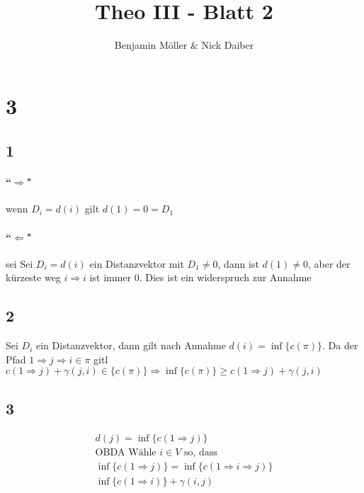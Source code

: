 \documentclass{article}
\title{Theo III - Blatt 2}
\author{Benjamin Möller \& Nick Daiber}
\begin{document}
\maketitle
\section*{3}
\subsection*{1}
\paragraph{``$\Rightarrow$"\\}
wenn $D_i = d(i)$ gilt $d(1)=0=D_1$
\paragraph{``$\Leftarrow$"\\}
sei Sei $D_i = d(i)$ ein Distanzvektor mit $D_1\neq 0$,
dann ist $d(1) \neq 0$, aber der kürzeste weg $i\Rightarrow i$ ist immer 0.
Dies ist ein widerspruch zur Annahme
\subsection*{2}

Sei $D_i$ ein Distanzvektor, dann gilt nach Annahme
$d(i) = \inf\{c(\pi)\}$.
Da der Pfad $1\Rightarrow j \Rightarrow i \in\pi$
gitl $c(1\Rightarrow j)+\gamma(j,i)\in\{c(\pi)\}\Rightarrow \inf\{c(\pi)\}\geq c(1\Rightarrow j)+\gamma(j, i)$

\subsection*{3}
\begin{align*}
    d(j) = \inf\{c(1\Rightarrow j)\}\\
    \text{OBDA Wähle } i\in V\text{ so, dass}\\
    \inf\{c(1\Rightarrow j)\}=\inf\{c(1\Rightarrow i\Rightarrow j)\}\\
    \inf\{c(1\Rightarrow i)\} +  \gamma(i, j)\\
\end{align*}
\end{document}
